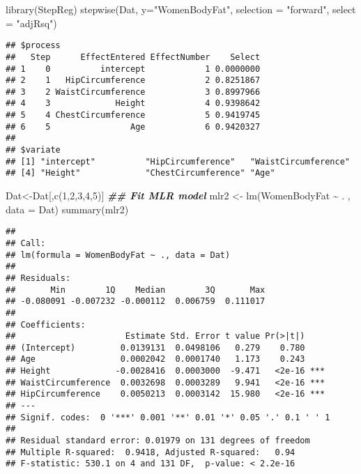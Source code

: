 \documentclass[
]{article}
\newenvironment{Shaded}{\begin{snugshade}}{\end{snugshade}}
\newcommand{\AttributeTok}[1]{\textcolor[rgb]{0.77,0.63,0.00}{#1}}
\newcommand{\DecValTok}[1]{\textcolor[rgb]{0.00,0.00,0.81}{#1}}
\newcommand{\DocumentationTok}[1]{\textcolor[rgb]{0.56,0.35,0.01}{\textbf{\textit{#1}}}}
\newcommand{\FunctionTok}[1]{\textcolor[rgb]{0.00,0.00,0.00}{#1}}
\newcommand{\NormalTok}[1]{#1}
\newcommand{\OtherTok}[1]{\textcolor[rgb]{0.56,0.35,0.01}{#1}}
\newcommand{\SpecialCharTok}[1]{\textcolor[rgb]{0.00,0.00,0.00}{#1}}
\newcommand{\StringTok}[1]{\textcolor[rgb]{0.31,0.60,0.02}{#1}}
\begin{document}
\begin{Shaded}
\begin{Highlighting}[]
\FunctionTok{library}\NormalTok{(StepReg)}
\FunctionTok{stepwise}\NormalTok{(Dat, }\AttributeTok{y=}\StringTok{"WomenBodyFat"}\NormalTok{, }\AttributeTok{selection =} \StringTok{"forward"}\NormalTok{, }\AttributeTok{select =} \StringTok{"adjRsq"}\NormalTok{)}
\end{Highlighting}
\end{Shaded}

\begin{verbatim}
## $process
##   Step      EffectEntered EffectNumber    Select
## 1    0          intercept            1 0.0000000
## 2    1   HipCircumference            2 0.8251867
## 3    2 WaistCircumference            3 0.8997966
## 4    3             Height            4 0.9398642
## 5    4 ChestCircumference            5 0.9419745
## 6    5                Age            6 0.9420327
## 
## $variate
## [1] "intercept"          "HipCircumference"   "WaistCircumference"
## [4] "Height"             "ChestCircumference" "Age"
\end{verbatim}

\begin{Shaded}
\begin{Highlighting}[]
\NormalTok{Dat}\OtherTok{\textless{}{-}}\NormalTok{Dat[,}\FunctionTok{c}\NormalTok{(}\DecValTok{1}\NormalTok{,}\DecValTok{2}\NormalTok{,}\DecValTok{3}\NormalTok{,}\DecValTok{4}\NormalTok{,}\DecValTok{5}\NormalTok{)]}
\DocumentationTok{\#\# Fit MLR model}
\NormalTok{mlr2 }\OtherTok{\textless{}{-}} \FunctionTok{lm}\NormalTok{(WomenBodyFat }\SpecialCharTok{\textasciitilde{}}\NormalTok{ . , }\AttributeTok{data =}\NormalTok{ Dat)}
\FunctionTok{summary}\NormalTok{(mlr2)}
\end{Highlighting}
\end{Shaded}

\begin{verbatim}
## 
## Call:
## lm(formula = WomenBodyFat ~ ., data = Dat)
## 
## Residuals:
##       Min        1Q    Median        3Q       Max 
## -0.080091 -0.007232 -0.000112  0.006759  0.111017 
## 
## Coefficients:
##                      Estimate Std. Error t value Pr(>|t|)    
## (Intercept)         0.0139131  0.0498106   0.279    0.780    
## Age                 0.0002042  0.0001740   1.173    0.243    
## Height             -0.0028416  0.0003000  -9.471   <2e-16 ***
## WaistCircumference  0.0032698  0.0003289   9.941   <2e-16 ***
## HipCircumference    0.0050213  0.0003142  15.980   <2e-16 ***
## ---
## Signif. codes:  0 '***' 0.001 '**' 0.01 '*' 0.05 '.' 0.1 ' ' 1
## 
## Residual standard error: 0.01979 on 131 degrees of freedom
## Multiple R-squared:  0.9418, Adjusted R-squared:   0.94 
## F-statistic: 530.1 on 4 and 131 DF,  p-value: < 2.2e-16
\end{verbatim}
\end{document}
